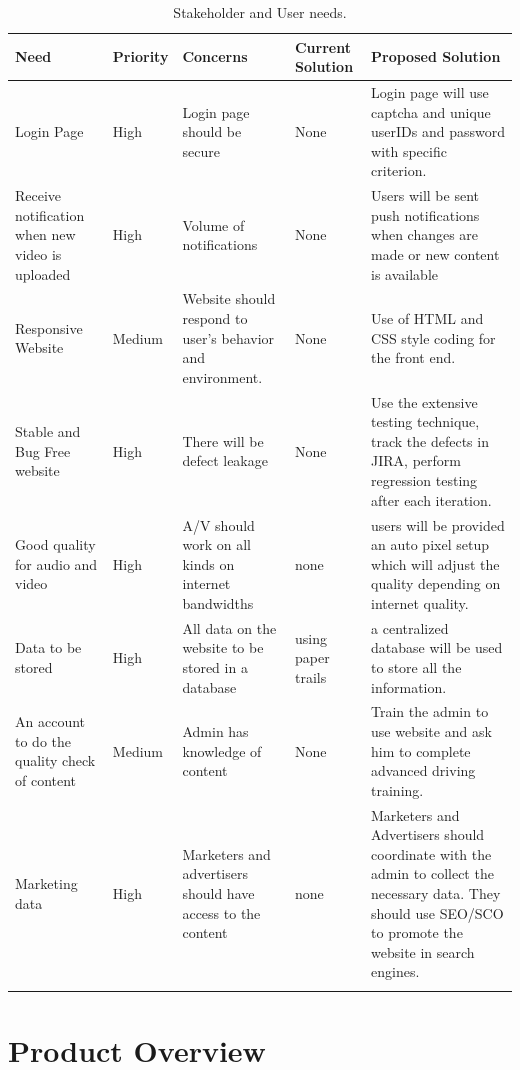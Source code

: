 \documentclass{report}
\begin{document}
\begin{longtable}{|p{2.5cm}|p{2.5cm}|p{3.5cm}|p{3.5cm}|p{3.5cm}|}
\hline
\textbf{Need} & \textbf{Priority} & \textbf{Concerns} & \textbf{Current Solution} & \textbf{Proposed Solution}\\ \hline

Login Page & High & Login page should be secure & None & Login page will use captcha and unique userIDs and password with specific criterion.\\ \hline
Receive notification when new video is uploaded & High & Volume of notifications & None & Users will be sent push notifications when changes are made or new content is available\\ \hline
Responsive Website & Medium & Website should respond to user's behavior and environment. & None & Use of HTML and CSS style coding for the front end. \\ \hline
Stable and Bug Free website & High & There will be defect leakage & None & Use the extensive testing technique, track the defects in JIRA, perform regression testing after each iteration. \\ \hline
Good quality for audio and video & High & A/V should work on all kinds on internet bandwidths& none & users will be provided an auto pixel setup which will adjust the quality depending on internet quality. \\ \hline
Data to be stored & High & All data on the website to be stored in a database & using paper trails & a centralized database will be used to store all the information. \\ \hline
An account to do the quality check of content & Medium & Admin has knowledge of content & None & Train the admin to use website and ask him to complete advanced driving training.\\ \hline
Marketing data & High & Marketers and advertisers should have access to the content & none & Marketers and Advertisers should coordinate with the admin to collect the necessary data. They should use SEO/SCO to promote the website in search engines.\\ \hline
\caption{Stakeholder and User needs.\label{long}}\\
\end{longtable}


\section{Product Overview}
\end{document}
